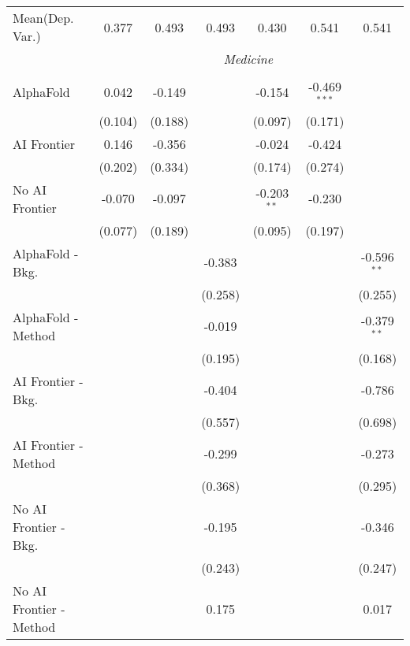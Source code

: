 \begin{tabular}{lcccccc}
Mean(Dep. Var.) & 0.377 & 0.493 & 0.493 & 0.430 & 0.541 & 0.541 \\
 & \multicolumn{6}{c}{\textit{Medicine}} \\ \\
   AlphaFold               & 0.042   & -0.149  &         & -0.154        & -0.469$^{***}$ &   \\   
                           & (0.104) & (0.188) &         & (0.097)       & (0.171)        &   \\   
   AI Frontier             & 0.146   & -0.356  &         & -0.024        & -0.424         &   \\   
                           & (0.202) & (0.334) &         & (0.174)       & (0.274)        &   \\   
   No AI Frontier          & -0.070  & -0.097  &         & -0.203$^{**}$ & -0.230         &   \\   
                           & (0.077) & (0.189) &         & (0.095)       & (0.197)        &   \\   
   AlphaFold - Bkg.        &         &         & -0.383  &               &                & -0.596$^{**}$\\   
                           &         &         & (0.258) &               &                & (0.255)\\   
   AlphaFold - Method      &         &         & -0.019  &               &                & -0.379$^{**}$\\   
                           &         &         & (0.195) &               &                & (0.168)\\   
   AI Frontier - Bkg.      &         &         & -0.404  &               &                & -0.786\\   
                           &         &         & (0.557) &               &                & (0.698)\\   
   AI Frontier - Method    &         &         & -0.299  &               &                & -0.273\\   
                           &         &         & (0.368) &               &                & (0.295)\\   
   No AI Frontier - Bkg.   &         &         & -0.195  &               &                & -0.346\\   
                           &         &         & (0.243) &               &                & (0.247)\\   
   No AI Frontier - Method &         &         & 0.175   &               &                & 0.017\\   

\end{tabular}

